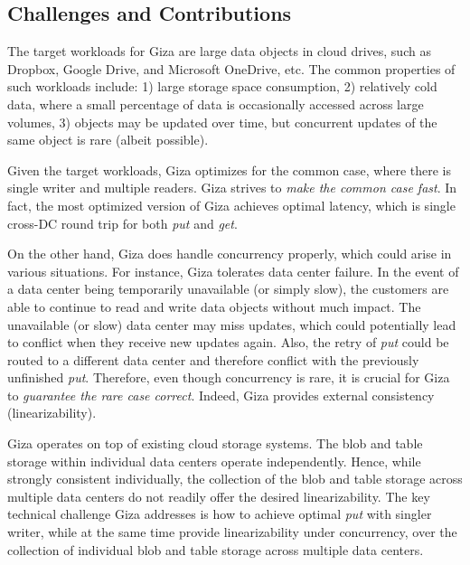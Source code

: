 \subsection{Challenges and Contributions}

The target workloads for Giza are large data objects in cloud drives, such as Dropbox, Google Drive, and Microsoft OneDrive, etc. The common properties of such workloads include: 1) large storage space consumption, 2) relatively cold data, where a small percentage of data is occasionally accessed across large volumes, 3) objects may be updated over time, but concurrent updates of the same object is rare (albeit possible).

Given the target workloads, Giza optimizes for the common case, where there is single writer and multiple readers. Giza strives to {\em make the common case fast}. In fact, the most optimized version of Giza achieves optimal latency, which is single cross-DC round trip for both {\em put} and {\em get}.

On the other hand, Giza does handle concurrency properly, which could arise in various situations. For instance, Giza tolerates data center failure. In the event of a data center being temporarily unavailable (or simply slow), the customers are able to continue to read and write data objects without much impact. The unavailable (or slow) data center may miss updates, which could potentially lead to conflict when they receive new updates again. Also, the retry of {\em put} could be routed to a different data center and therefore conflict with the previously unfinished {\em put}. Therefore, even though concurrency is rare, it is crucial for Giza to {\em guarantee the rare case correct}. Indeed, Giza provides external consistency (linearizability).

Giza operates on top of existing cloud storage systems. 
The blob and table storage within individual data centers operate independently. Hence, while strongly consistent individually, the collection of the blob and table storage across multiple data centers do not readily offer the desired linearizability. The key technical challenge Giza addresses is how to achieve optimal {\em put} with singler writer, while at the same time provide linearizability under concurrency, over the collection of individual blob and table storage across multiple data centers.

